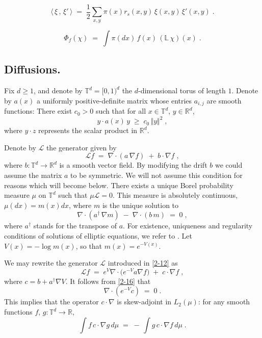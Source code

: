 \documentclass[reqno]{amsart}
\newcounter{as}[section]
\newcommand{\mc}[1]{{\mathcal #1}}
\newcommand{\bb}[1]{{\mathbb #1}}
\newcommand{\<}{\langle}
\renewcommand{\>}{\rangle}
\begin{document}
\begin{equation*}
\<\, \xi \,,\, \xi' \,\> 
\;=\; \frac 12 \sum_{x,y} \pi(x) r_s(x,y) \, \xi(x,y)\, \xi' (x,y)\;.
\end{equation*}


\begin{equation*}
\Phi_f (\chi) \;=\; \int \pi(dx)\, f(x)\, (\bb L\, \chi)(x)\;.
\end{equation*}

\subsection{Diffusions.}

Fix $d\ge 1$, and denote by $\bb T^d = [0,1)^d$ the
$d$-dimensional torus of length $1$.  Denote by {\color{blue}$a(x)$} a
uniformly positive-definite matrix whose entries $a_{i,j}$ are smooth
functions: There exist $c_0>0$ such that for all $x\in \bb T^d$,
$y\in \bb R^d$,
\begin{equation}
\label{19}
y \cdot a (x) \, y \;\ge\; c_0 \, \Vert y \Vert^2 \;,
\end{equation}
where {\color{blue} $y\cdot z$} represents the scalar product in
$\bb R^d$.

\smallskip{}
Denote by $\mc L$ the generator given by
\begin{equation}
\label{2-12}
\mc L f\;=\; \nabla \cdot (a \, \nabla f) \;+\; b \cdot \nabla f \;, 
\end{equation}
where $b: \bb T^d \to \bb R^d$ is a smooth vector field. By modifying
the drift $b$ we could assume the matrix $a$ to be symmetric. We will
not assume this condition for reasons which will become below. There
exists a unique Borel probability measure $\mu$ on $\bb T^d$ such that
$\mu \mc L=0$. This measure is absolutely continuous, $\mu(dx) = m(x)
dx$, where $m$ is the unique solution to
\begin{equation}
\label{2-16}
\nabla \cdot (a^\dagger \, \nabla m) \;-\; \nabla \cdot (b\, m) \;=\;
0 \;, 
\end{equation}
where {\color{blue}$a^\dagger$} stands for the transpose of $a$. For
existence, uniqueness and regularity conditions of solutions of
elliptic equations, we refer to \cite{gt}. Let $V(x) = - \log m(x)$,
so that $m(x) = e^{-V(x)}$.

We may rewrite the generator $\mc L$ introduced in \eqref{2-12} as
\begin{equation*}
\mc L f \;=\;  e^V \nabla \cdot \big( e^{-V} a \nabla f\big)
\;+\; c\cdot \nabla f\;,
\end{equation*}
where {\color{blue} $c=b + a^\dagger \nabla V$}. It follows from
\eqref{2-16} that
\begin{equation}
\label{2-07}
\nabla \cdot (e^{-V} c) \;=\; 0\;.
\end{equation}
This implies that the operator $c\cdot \nabla$ is skew-adjoint in
$L_2(\mu)$: for any smooth functions $f$, $g: \bb T^d\to \bb R$,
\begin{equation}
\label{2-01}
\int f \, c\cdot \nabla g \, d\mu
\;=\; -\, \int g\,  c\cdot \nabla f \, d\mu\;.
\end{equation}
\end{document}
